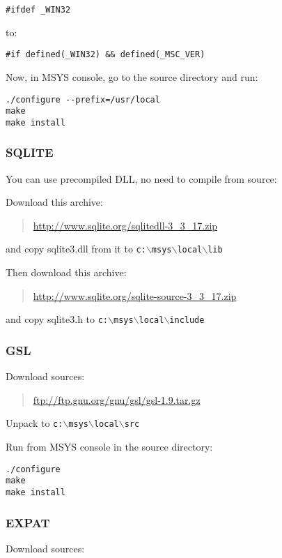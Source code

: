 \begin{verbatim}
#ifdef _WIN32
\end{verbatim}
to:

\begin{verbatim}
#if defined(_WIN32) && defined(_MSC_VER)
\end{verbatim}

Now, in MSYS console, go to the source directory and run:

\begin{verbatim}
./configure --prefix=/usr/local
make
make install
\end{verbatim}

\subsubsection{SQLITE}
You can use precompiled DLL, no need to compile from source:

Download this archive:

	\begin{quotation}
\url{http://www.sqlite.org/sqlitedll-3\_3\_17.zip}
	\end{quotation}

and copy sqlite3.dll from it to \texttt{c:$\backslash$msys$\backslash$local$\backslash$lib}

Then download this archive:

	\begin{quotation}
\url{http://www.sqlite.org/sqlite-source-3\_3\_17.zip}
	\end{quotation}

and copy sqlite3.h to \texttt{c:$\backslash$msys$\backslash$local$\backslash$include}

\subsubsection{GSL}
Download sources:

	\begin{quotation}
\url{ftp://ftp.gnu.org/gnu/gsl/gsl-1.9.tar.gz}
	\end{quotation}

Unpack to \texttt{c:$\backslash$msys$\backslash$local$\backslash$src}

Run from MSYS console in the source directory:

\begin{verbatim}
./configure
make
make install
\end{verbatim}

\subsubsection{EXPAT}
Download sources:

